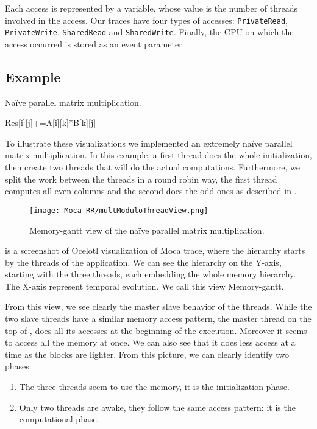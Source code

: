Each access is represented by a variable, whose value is the number of threads involved in the access.
Our traces have four types of accesses: \texttt{PrivateRead}, \texttt{PrivateWrite}, \texttt{SharedRead} and \texttt{SharedWrite}.
Finally, the \gls{CPU} on which the access occurred is stored as an event parameter.

\subsection{Example}

\begin{algorithm}
    \caption{Naïve parallel matrix multiplication.}
    \label{alg:mat-par}
    \begin{algorithmic}
                    \State Res[i][j]+=A[i][k]*B[k][j]
                \EndFor
            \EndFor
        \EndFor
    \end{algorithmic}
\end{algorithm}

To illustrate these visualizations we implemented an extremely naïve parallel matrix multiplication.
In this example, a first thread does the whole initialization, then create two threads that will do the actual computations.
Furthermore, we split the work between the threads in a round robin way, the first thread computes all even columns and the second does the odd ones as described in .

\begin{figure}[htb]
    \centering
    \texttt{[image: Moca-RR/multModuloThreadView.png]}
    \caption{Memory-gantt view of the naïve parallel matrix multiplication.}
    \label{fig:ocelotl-th0}
\end{figure}

 is a screenshot of \gls{Ocelotl} visualization of \gls{Moca} trace, where the hierarchy starts by the threads of the application.
We can see the hierarchy on the Y-axis, starting with the three threads, each embedding the whole memory hierarchy.
The X-axis represent temporal evolution.
We call this view Memory-gantt.

From this view, we see clearly the master slave behavior of the threads.
While the two slave threads have a similar memory access pattern, the master thread on the top of , does all its accesses at the beginning of the execution.
Moreover it seems to access all the memory at once.
We can also see that it does less access at a time as the blocks are lighter.
From this picture, we can clearly identify two phases:
\begin{enumerate}
    \item The three threads seem to use the memory, it is the initialization phase.
    \item Only two threads are awake, they follow the same access pattern: it
        is the computational phase.
\end{enumerate}

